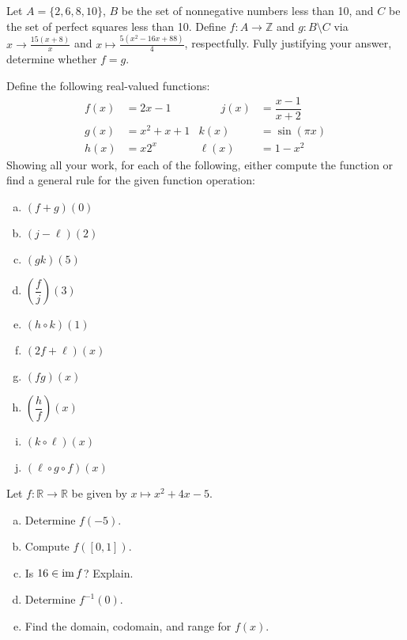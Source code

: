 \documentclass[11pt,letterpaper]{article}
\begin{document}

 Let $A= \{ 2, 6, 8, 10 \}$, $B$ be the set of nonnegative numbers less than 10, and $C$ be the set of perfect squares less than 10. Define $f: A \to \mathbb{Z}$ and $g: B \setminus C$ via $x \to \frac{15(x + 8)}{x}$ and $x \mapsto \frac{5(x^2 - 16x + 88)}{4}$, respectfully. Fully justifying your answer, determine whether $f= g$. 



\newpage



 Define the following real-valued functions:
	\[
	\begin{aligned}
	f(x)&= 2x - 1 &\qquad j(x)&= \dfrac{x - 1}{x + 2} \\
	g(x)&= x^2 + x + 1 & k(x)&= \sin(\pi x) \\
	h(x)&= x 2^x & \ell(x)&= 1 - x^2
	\end{aligned}
	\]
Showing all your work, for each of the following, either compute the function or find a general rule for the given function operation:
	\begin{enumerate}[(a)]
	\item $(f + g)(0)$
	\item $(j - \ell)(2)$
	\item $(gk)(5)$
	\item $\left( \dfrac{f}{j} \right) (3)$
	\item $(h \circ k)(1)$
	\item $(2f + \ell)(x)$
	\item $(fg)(x)$
	\item $\left( \dfrac{h}{f} \right)(x)$
	\item $(k \circ \ell)(x)$
	\item $(\ell \circ g \circ f)(x)$
	\end{enumerate}



\newpage



 Let $f: \mathbb{R} \to \mathbb{R}$ be given by $x \mapsto x^2 + 4x - 5$.
	\begin{enumerate}[(a)]
	\item Determine $f(-5)$.
	\item Compute $f([0,1])$.
	\item Is $16 \in \operatorname{im} f$? Explain. 
	\item Determine $f^{-1}(0)$.
	\item Find the domain, codomain, and range for $f(x)$. 
	\end{enumerate}
\end{document}
